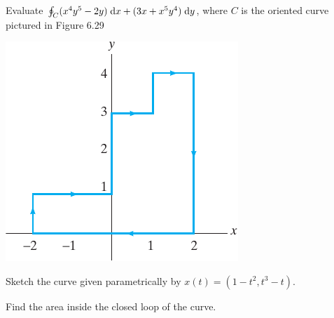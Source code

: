 \documentclass[boxes,printing,blanks]{gsypset}
\begin{document}
	\begin{problem}[6.2.13]
		Evaluate $\oint_C (x^4y^5 - 2y)\;\mathrm{d}x + (3x + x^5y^4)\;\mathrm{d}y$, 
		where $C$ is the oriented curve pictured in Figure 6.29
		
		\begin{center}
			\includegraphics{img/6_2_13}
			\renewcommand{\thefigure}{6.29}
		\end{center}
	\end{problem}
	\begin{solution}
		
	\end{solution}
	
	\begin{problem}[6.2.15]
		\begin{subproblems}
			\subproblem Sketch the curve given parametrically by $x(t) = (1-t^2, t^3-t)$.
				\begin{solution}
					
				\end{solution}
			\subproblem Find the area inside the closed loop of the curve.
				\begin{solution}
					
				\end{solution}
		\end{subproblems}
	\end{problem}
	
\end{document}
